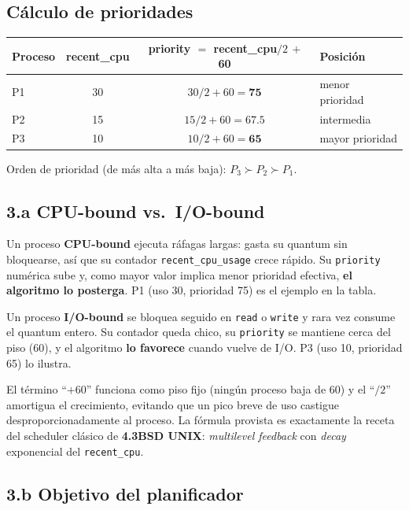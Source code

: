 \documentclass[11pt,a4paper]{article}
\begin{document}
\subsection*{Cálculo de prioridades}

\begin{center}
\small
\begin{tabular}{@{}lccl@{}}
\toprule
Proceso & recent\_cpu & priority $=$ recent\_cpu$/2$ $+$ 60 & Posición \\
\midrule
P1 & 30 & $30/2 + 60 = \mathbf{75}$    & menor prioridad \\
P2 & 15 & $15/2 + 60 = \mathbf{67.5}$  & intermedia \\
P3 & 10 & $10/2 + 60 = \mathbf{65}$    & mayor prioridad \\
\bottomrule
\end{tabular}
\end{center}

Orden de prioridad (de más alta a más baja): $P_3 \succ P_2 \succ P_1$.

\subsection{3.a CPU-bound vs.\ I/O-bound}

Un proceso \textbf{CPU-bound} ejecuta ráfagas largas: gasta su
quantum sin bloquearse, así que su contador
\texttt{recent\_cpu\_usage} crece rápido. Su \texttt{priority}
numérica sube y, como mayor valor implica menor prioridad efectiva,
\textbf{el algoritmo lo posterga}. P1 (uso 30, prioridad 75) es el
ejemplo en la tabla.

Un proceso \textbf{I/O-bound} se bloquea seguido en \texttt{read} o
\texttt{write} y rara vez consume el quantum entero. Su contador
queda chico, su \texttt{priority} se mantiene cerca del piso (60), y
el algoritmo \textbf{lo favorece} cuando vuelve de I/O. P3 (uso 10,
prioridad 65) lo ilustra.

El término ``$+60$'' funciona como piso fijo (ningún proceso baja de
60) y el ``$/2$'' amortigua el crecimiento, evitando que un pico
breve de uso castigue desproporcionadamente al proceso. La fórmula
provista es exactamente la receta del scheduler clásico de
\textbf{4.3BSD UNIX}: \emph{multilevel feedback} con \emph{decay}
exponencial del \texttt{recent\_cpu}.

\subsection{3.b Objetivo del planificador}
\end{document}
